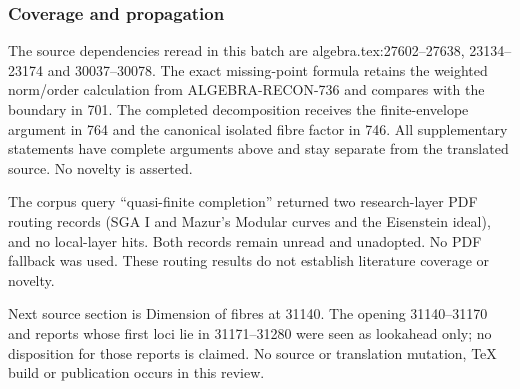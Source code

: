\subsubsection{Coverage and propagation}\label{algebra-proof-033-coverage-and-propagation}

The source dependencies reread in this batch are algebra.tex:27602--27638, 23134--23174 and 30037--30078. The exact missing-point formula retains the weighted norm/order calculation from ALGEBRA-RECON-736 and compares with the boundary in 701. The completed decomposition receives the finite-envelope argument in 764 and the canonical isolated fibre factor in 746. All supplementary statements have complete arguments above and stay separate from the translated source. No novelty is asserted.

The corpus query ``quasi-finite completion'' returned two research-layer PDF routing records (SGA I and Mazur's Modular curves and the Eisenstein ideal), and no local-layer hits. Both records remain unread and unadopted. No PDF fallback was used. These routing results do not establish literature coverage or novelty.

Next source section is Dimension of fibres at 31140. The opening 31140--31170 and reports whose first loci lie in 31171--31280 were seen as lookahead only; no disposition for those reports is claimed. No source or translation mutation, TeX build or publication occurs in this review.
